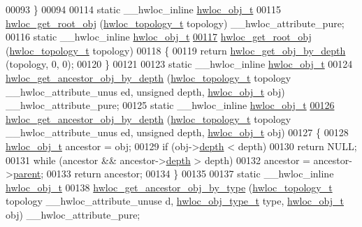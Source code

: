 \begin{DoxyCode}
00093 \}
00094 
00114 \textcolor{keyword}{static} \_\_hwloc\_inline \hyperlink{a00016}{hwloc_obj_t}
00115 \hyperlink{a00053_gadbf58f6e187efbdb3cd9a8e30311b7d7}{hwloc_get_root_obj} (\hyperlink{a00039_ga9d1e76ee15a7dee158b786c30b6a6e38}{hwloc_topology_t} topology) \_\_hwloc\_attribute\_pure;
00116 \textcolor{keyword}{static} \_\_hwloc\_inline \hyperlink{a00016}{hwloc_obj_t}
\hypertarget{a00031_source_l00117}{}\hyperlink{a00053_gadbf58f6e187efbdb3cd9a8e30311b7d7}{00117} \hyperlink{a00053_gadbf58f6e187efbdb3cd9a8e30311b7d7}{hwloc_get_root_obj} (\hyperlink{a00039_ga9d1e76ee15a7dee158b786c30b6a6e38}{hwloc_topology_t} topology)
00118 \{
00119   \textcolor{keywordflow}{return} \hyperlink{a00047_gaedd78240b0c1108355586a268ec5a697}{hwloc_get_obj_by_depth} (topology, 0, 0);
00120 \}
00121 
00123 \textcolor{keyword}{static} \_\_hwloc\_inline \hyperlink{a00016}{hwloc_obj_t}
00124 \hyperlink{a00053_ga9b9d6af74eb0b78b1384aa66dd058ddc}{hwloc_get_ancestor_obj_by_depth} (\hyperlink{a00039_ga9d1e76ee15a7dee158b786c30b6a6e38}{hwloc_topology_t} topology \_\_hwloc\_attribute\_unus
      ed, \textcolor{keywordtype}{unsigned} depth, \hyperlink{a00016}{hwloc_obj_t} obj) \_\_hwloc\_attribute\_pure;
00125 \textcolor{keyword}{static} \_\_hwloc\_inline \hyperlink{a00016}{hwloc_obj_t}
\hypertarget{a00031_source_l00126}{}\hyperlink{a00053_ga9b9d6af74eb0b78b1384aa66dd058ddc}{00126} \hyperlink{a00053_ga9b9d6af74eb0b78b1384aa66dd058ddc}{hwloc_get_ancestor_obj_by_depth} (\hyperlink{a00039_ga9d1e76ee15a7dee158b786c30b6a6e38}{hwloc_topology_t} topology \_\_hwloc\_attribute\_unus
      ed, \textcolor{keywordtype}{unsigned} depth, \hyperlink{a00016}{hwloc_obj_t} obj)
00127 \{
00128   \hyperlink{a00016}{hwloc_obj_t} ancestor = obj;
00129   \textcolor{keywordflow}{if} (obj->\hyperlink{a00016_a9d82690370275d42d652eccdea5d3ee5}{depth} < depth)
00130     \textcolor{keywordflow}{return} NULL;
00131   \textcolor{keywordflow}{while} (ancestor && ancestor->\hyperlink{a00016_a9d82690370275d42d652eccdea5d3ee5}{depth} > depth)
00132     ancestor = ancestor->\hyperlink{a00016_adc494f6aed939992be1c55cca5822900}{parent};
00133   \textcolor{keywordflow}{return} ancestor;
00134 \}
00135 
00137 \textcolor{keyword}{static} \_\_hwloc\_inline \hyperlink{a00016}{hwloc_obj_t}
00138 \hyperlink{a00053_gac93e1a95a71add57ac841daef1b94e5e}{hwloc_get_ancestor_obj_by_type} (\hyperlink{a00039_ga9d1e76ee15a7dee158b786c30b6a6e38}{hwloc_topology_t} topology \_\_hwloc\_attribute\_unuse
      d, \hyperlink{a00041_gacd37bb612667dc437d66bfb175a8dc55}{hwloc_obj_type_t} type, \hyperlink{a00016}{hwloc_obj_t} obj) \_\_hwloc\_attribute\_pure;

\end{DoxyCode}
